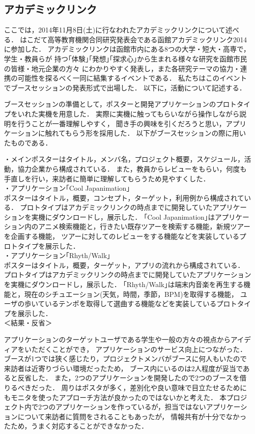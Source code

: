 \subsection{アカデミックリンク}
\par
ここでは，2014年11月8日(土)に行なわれたアカデミックリンクについて述べる．
はこだて高等教育機関合同研究発表会である函館アカデミックリンク2014に参加した．
アカデミックリンクは函館市内にある8つの大学・短大・高専で，学生・教員らが
持つ｢体験｣｢発想｣｢探求心｣から生まれる様々な研究を函館市民の皆様・地元企業の方々
にわかりやすく発表し，また各研究テーマの協力・連携の可能性を探るべく一同に結集するイベントである．
私たちはこのイベントでブースセッションの発表形式で出場した．
以下に，活動について記述する．
\par
ブースセッションの準備として，ポスターと開発アプリケーションのプロトタイプをいれた実機を用意した．
実際に実機に触ってもらいながら操作しながら説明を行うことが一番理解しやすく，
聞き手の興味を引くだろうと思い，アプリケーションに触れてもらう形を採用した．
以下がブースセッションの際に用いたものである．

\par
・メインポスターはタイトル，メンバ名，プロジェクト概要，スケジュール，活動，協力企業から構成されている．
また，教員からレビューをもらい，何度も手直しを行い，来訪者に簡単に理解してもらうため見やすくした．
\\
・アプリケーション｢Cool Japanimation｣\\
ポスターはタイトル，概要，コンセプト，ターゲット，利用例から構成されている．
プロトタイプはアカデミックリンクの時点までに開発していたアプリケーションを実機にダウンロードし，展示した．
｢Cool Japanimation｣はアプリケーション内のアニメ検索機能と，行きたい既存ツアーを検索する機能，新規ツアーを企画する機能，
ツアーに対してのレビューをする機能などを実装しているプロトタイプを展示した．
\\
・アプリケーション｢Rhyth/Walk｣\\
ポスターはタイトル，概要，ターゲット，アプリの流れから構成されている．
プロトタイプはアカデミックリンクの時点までに開発していたアプリケーションを実機にダウンロードし，展示した．
｢Rhyth/Walk｣は端末内音楽を再生する機能と，現在のシチュエーション(天気，時間，季節，BPM)を取得する機能，
ユーザの歩いているテンポを取得して選曲する機能などを実装しているプロトタイプを展示した．
\\
＜結果・反省＞
\par
アプリケーションのターゲットユーザである学生や一般の方々の視点からアイディアをいただくことができ，
アプリケーションのサービス向上につながった．
ブースが1つでは狭く感じたり，プロジェクトメンバがブースに何人もいたので来訪者は近寄りづらい環境だったため，
ブース内にいるのは2人程度が妥当であると反省した．
また，2つのアプリケーションを開発したので2つのブースを借りるべきだった．
周りはポスタが多く，差別化や良い意味で目立たせるためにもモニタを使ったアプローチ方法が良かったのではないかと考えた．
本プロジェクト内で2つのアプリケーションを作っているが，担当ではないアプリケーションについて来訪者に質問をされることもあったが，
情報共有が十分でなかったため，うまく対応することができなかった．

\par
